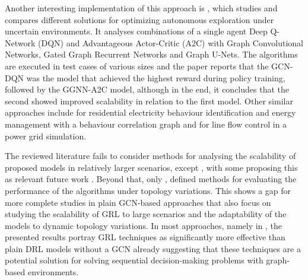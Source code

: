 Another interesting implementation of this approach is \cite{chenAutonomousExplorationUncertainty2020}, which studies and compares different solutions for optimizing autonomous exploration under uncertain environments. It analyses combinations of a single agent Deep Q-Network (DQN) and Advantageous Actor-Critic (A2C) with Graph Convolutional Networks, Gated Graph Recurrent Networks and Graph U-Nets. The algorithms are executed in test cases of various sizes and the paper reports that the GCN-DQN was the model that achieved the highest reward during policy training, followed by the GGNN-A2C model, although in the end, it concludes that the second showed improved scalability in relation to the first model. Other similar approaches include \cite{chenGraphRepresentationLearningbased2023} for residential electricity behaviour identification and energy management with a behaviour correlation graph and \cite{xuSimulationConstraintGraphReinforcement2020} for line flow control in a power grid simulation. \par
The reviewed literature fails to consider methods for analysing the scalability of proposed models in relatively larger scenarios, except \cite{chenAutonomousExplorationUncertainty2020}, with some proposing this as relevant future work \cite{chenScalableGraphReinforcement2023, xingGraphReinforcementLearningBased2023}. Beyond that, only \cite{xingGraphReinforcementLearningBased2023}, \cite{chenGraphRepresentationLearningbased2023} \cite{chenScalableGraphReinforcement2023} defined methods for evaluating the performance of the algorithms under topology variations. This shows a gap for more complete studies in plain \ac{GCN}-based approaches that also focus on studying the scalability of \ac{GRL} to large scenarios and the adaptability of the models to dynamic topology variations. In most approaches, namely in \cite{xingGraphReinforcementLearningBased2023, chenScalableGraphReinforcement2023, liNovelGraphReinforcement2022, xuSimulationConstraintGraphReinforcement2020}, the presented results portray \ac{GRL} techniques as significantly more effective than plain \ac{DRL} models without a \ac{GCN} already suggesting that these techniques are a potential solution for solving sequential decision-making problems with graph-based environments.

